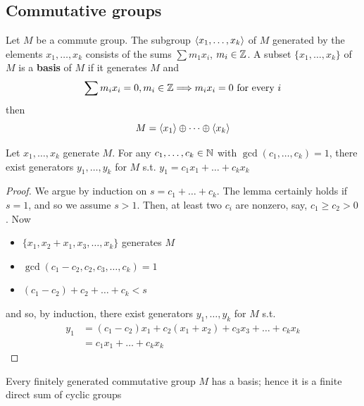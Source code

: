 \documentclass[11pt]{article}
\begin{document}
\subsection{Commutative groups}
\label{sec:orge5007e3}
Let \(M\) be a commute group. The subgroup \(\langle x_1,\dots,x_k\rangle\) of \(M\) generated by the
elements \(x_1,\dots,x_k\) consists of the sums \(\sum m_1x_i\), \(m_i\in\mathbb{Z}\). A subset \(\{x_1,\dots,x_k\}\)
of \(M\) is a \textbf{basis} of \(M\) if it generates \(M\) and
\begin{equation*}
\sum m_ix_i=0,m_i\in\mathbb{Z}\Longrightarrow m_ix_i=0\text{ for every }i
\end{equation*}
then
\begin{equation*}
M=\langle x_1\rangle\oplus\dots\oplus\langle x_k\rangle
\end{equation*}

\begin{lemma}[]
Let \(x_1,\dots,x_k\) generate \(M\). For any \(c_1,\dots,c_k\in\mathbb{N}\) with \(\gcd(c_1,\dots,c_k)=1\), there exist
generators \(y_1,\dots,y_k\) for \(M\) s.t. \(y_1=c_1x_1+\dots+c_kx_k\)
\end{lemma}

\begin{proof}
We argue by induction on \(s=c_1+\dots+c_k\). The lemma certainly holds if \(s=1\), and so we
assume \(s>1\). Then, at least two \(c_i\) are nonzero, say, \(c_1\ge c_2>0\). Now
\begin{itemize}
\item \(\{x_1,x_2+x_1,x_3,\dots,x_k\}\) generates \(M\)
\item \(\gcd(c_1-c_2,c_2,c_3,\dots,c_k)=1\)
\item \((c_1-c_2)+c_2+\dots+c_k<s\)
\end{itemize}


and so, by induction, there exist generators \(y_1,\dots,y_k\) for \(M\) s.t.
\begin{align*}
y_1&=(c_1-c_2)x_1+c_2(x_1+x_2)+c_3x_3+\dots+c_kx_k\\
&=c_1x_1+\dots+c_kx_k
\end{align*}
\end{proof}

\begin{theorem}[]
\label{1.54}
Every finitely generated commutative group \(M\) has a basis; hence it is a finite direct sum of
cyclic groups
\end{theorem}
\end{document}

